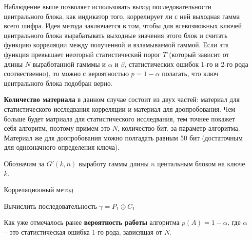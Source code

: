 \documentclass[a4paper,12pt]{article}
\theoremstyle{definition}
\begin{document}
	Наблюдение выше позволяет использовать выход последовательности центрального блока, как индикатор того, коррелирует ли с ней выходная гамма всего шифра. Идея метода заключается в том, чтобы для всевозможных ключей центрального блока вырабатывать выходные значения этого блок и считать функцию корреляции между полученной и взламываемой гаммой. Если эта функция превышает неоторый статистический порог $T$ (который зависит от длины $N$ выработанной гамммы и $\alpha$ и $\beta$, статистических ошибок 1-го и 2-го рода соотвественно), то можно с вероятностью $p=1-\alpha$ полагать, что ключ центрального блока подобран верно.

	\textbf{Количество материала} в данном случае состоит из двух частей: материал для статистического исследвания корреляции и материал для доопробования. Чем больше будет матриала для статистического исследвания, тем точнее покажет себя алгоритм, поэтому примем это $N$, количество бит, за параметр алгоритма. Материал же для доопробования можно полгадать равным 50 бит (достаточным для однозначного определения ключа).
	
	Обозначим за $G'(k, n)$ выработу гаммы длины $n$ центальным блоком на ключе $k$.
	
	\begin{algorithm}[H]
		
		\caption{Корреляциооный метод}
		\label{alg:Corr}
		\SetAlgoNoEnd
		
		
		Вычислить последовательность $\gamma = P_1 \oplus C_1$
		
	\end{algorithm}	
	
	Как уже отмечалось ранее \textbf{вероятность работы} алгоритма $p(A)=1-\alpha$, где $\alpha$ -- это статистическая ошибка 1-го рода, зависящая от $N$. 
	
\end{document}
